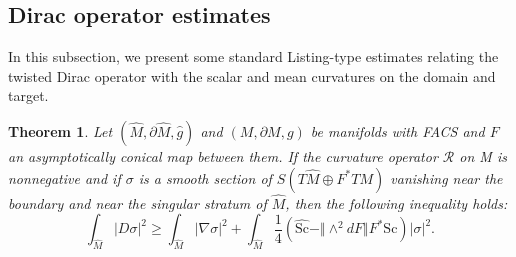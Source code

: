 \documentclass[12pt, reqno]{amsart}
\theoremstyle{plain} %
\newtheorem{theorem}{Theorem}[section]
\theoremstyle{definition}
\theoremstyle{remark}
\numberwithin{equation}{section}
\newcommand{\dom}[1]{\hat{#1}}
\newcommand{\onorm}[1]{\Vert #1 \Vert}
\newcommand{\pnorm}[1]{| #1 |}
\newcommand{\bnd}[1]{\partial #1}
\newcommand{\Sc}{\mathrm{Sc}}
\begin{document}
\subsection{Dirac operator estimates}
In this subsection, we present some standard Listing-type estimates relating the twisted Dirac operator with the scalar and mean curvatures on the domain and target.
\begin{theorem}\label{thm:scalar curvature estimate}
    Let \((\dom{M}, \bnd{\dom{M}}, \dom{g})\) and \((M, \bnd{M}, g)\) be manifolds with FACS and \(F\) an asymptotically conical map between them.
    If the curvature operator \(\mathcal{R}\) on M is nonnegative and if \(\sigma\) is a smooth section of \(S(T\dom{M} \oplus F^*TM)\) vanishing near the boundary and near the singular stratum of \(\dom{M}\), then the following inequality holds:
    \begin{equation}\label{eqn:scalar curvature estimate}
        \int_{\dom{M}}\pnorm{D\sigma}^2\geq \int_{\dom{M}}\pnorm{\nabla \sigma}^2+
        \int_{\dom{M}} \frac{1}{4}(\dom{\Sc}-\onorm{\wedge^2dF}F^*\Sc )\pnorm{\sigma}^2.
    \end{equation}
\end{theorem}
\end{document}
